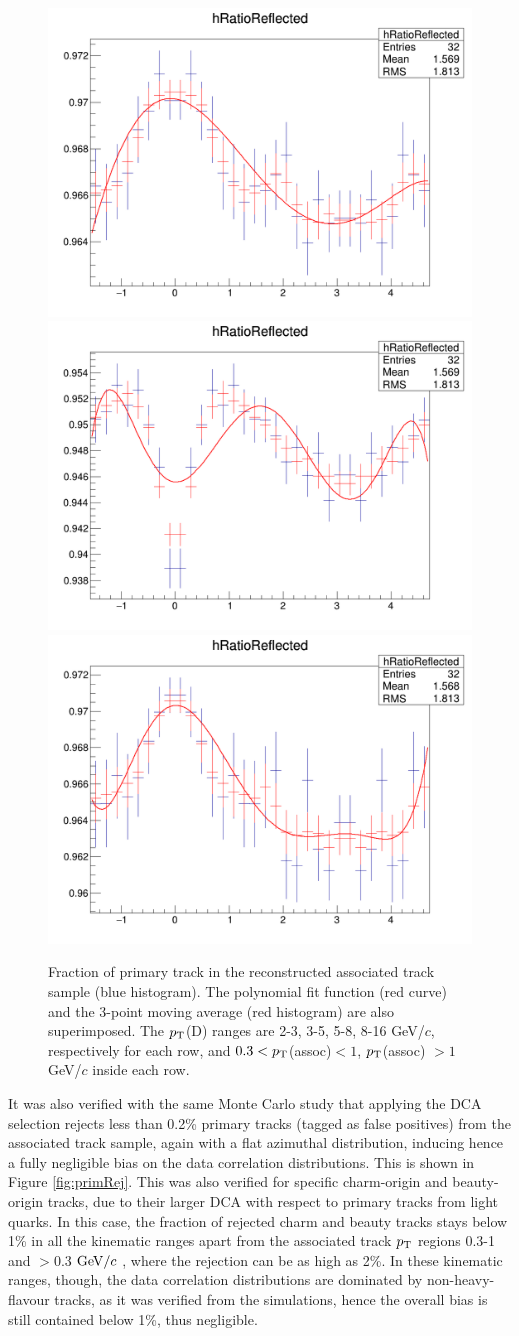 \begin{figure}[h]
{\includegraphics[width=0.4\linewidth]{figures/SecTracks/DeltaPhi_5to8_1to99_RatioPrimOverAll.png}} 
{\includegraphics[width=0.4\linewidth]{figures/SecTracks/DeltaPhi_8to16_03to1_RatioPrimOverAll.png}}
{\includegraphics[width=0.4\linewidth]{figures/SecTracks/DeltaPhi_8to16_1to99_RatioPrimOverAll.png}}
	\caption{Fraction of primary track in the reconstructed associated track sample (blue histogram). The polynomial fit function (red curve) and the 3-point moving average (red histogram) are also superimposed. The $p_{\rm T}$(D) ranges are 2-3, 3-5, 5-8, 8-16 GeV/$c$, respectively for each row, and $0.3 < p_{\rm T}$(assoc)$ < 1$, $p_{\rm T}$(assoc) $> 1$ GeV/$c$ inside each row.}
	\label{fig:secdPhi}	
\end{figure}

It was also verified with the same Monte Carlo study that applying the DCA selection rejects less than 0.2\% primary tracks (tagged as false positives) from the associated track sample, again with a flat azimuthal distribution, inducing hence a fully negligible bias on the data correlation distributions. This is shown in Figure \ref{fig:primRej}. This was also verified for specific charm-origin and beauty-origin tracks, due to their larger DCA with respect to primary tracks from light quarks. In this case, the fraction of rejected charm and beauty tracks stays below 1\% in all the kinematic ranges apart from the associated track $p_{\rm T}$ regions 0.3-1 and $>0.3$ $\mathrm{GeV}/c$ , where the rejection can be as high as 2\%. In these kinematic ranges, though, the data correlation distributions are dominated by non-heavy-flavour tracks, as it was verified from the simulations, hence the overall bias is still contained below 1\%, thus negligible.


